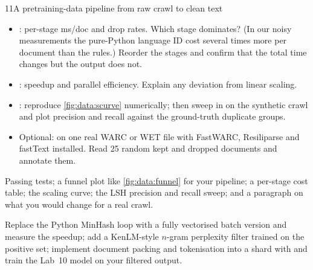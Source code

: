 \begin{labbox}{11}{A pretraining-data pipeline from raw crawl to clean text}
\begin{itemize}
  \item {}: per-stage ms/doc and drop rates. Which stage
        dominates? (In our noisy measurements the pure-Python language ID cost several times more
        per document than the rules.) Reorder the stages and confirm that the total time changes but the output does not.
  \item {}: speedup and parallel efficiency. Explain any
        deviation from linear scaling.
  \item {}: reproduce \cref{fig:data:scurve} numerically; then sweep 
        in  on the synthetic crawl and plot precision and recall against the ground-truth
        duplicate groups.
  \item Optional:  on one real WARC or WET file with FastWARC, Resiliparse and fastText
        installed. Read 25 random kept and dropped documents and annotate them.
\end{itemize}

Passing tests; a funnel plot like \cref{fig:data:funnel} for your pipeline; a per-stage cost
table; the scaling curve; the LSH precision and recall sweep; and a paragraph on what you would change
for a real crawl.

Replace the Python MinHash loop with a fully vectorised batch version and measure the speedup;
add a KenLM-style $n$-gram perplexity filter trained on the positive set; implement document
packing and tokenisation into a  shard with 
and train the Lab~10 model on your filtered output.
\end{labbox}
